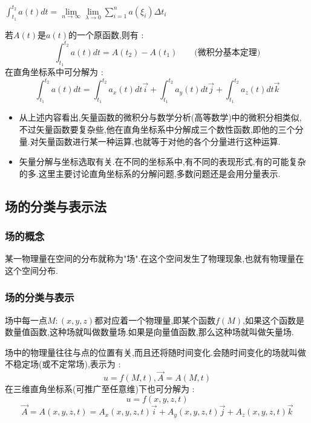\documentclass[UTF8,12pt]{ctexbook}
\newcommand{\limNormal}[1]{\lim\limits_{#1}}
\newcommand{\upDownSum}[2]{\sum\limits_{#2}^{#1}}
\newcommand{\defFunction}[1]{f(#1)}
\newcommand{\definiteIntegral}[2]{\int^{#1}_{#2}}
\newcommand{\spaceline}{\\\indent}
\begin{document}
{{{{{      $\definiteIntegral{t_2}{t_1}a(t)dt = \limNormal{n \to \infty}\limNormal{\lambda \to 0}\upDownSum{n}{i = 1}a(\xi_i)\Delta t_i$

      若$A(t)$是$a(t)$的一个原函数,则有 :
      $$
        \definiteIntegral{t_2}{t_1}a(t)dt = A(t_2) - A(t_1)\qquad \mbox{(微积分基本定理)}
      $$
      在直角坐标系中可分解为 :
      $$
        \definiteIntegral{t_2}{t_1}a(t)dt = \definiteIntegral{t_2}{t_1}a_x(t)dt\vec{i} + \definiteIntegral{t_2}{t_1}a_y(t)dt\vec{j} + \definiteIntegral{t_2}{t_1}a_z(t)dt\vec{k}
      $$
    }%

    \begin{itemize}
      \item 从上述内容看出,矢量函数的微积分与数学分析(高等数学)中的微积分相类似,不过矢量函数要复杂些,他在直角坐标系中分解成三个数性函数,即他的三个分量.对矢量函数进行某一种运算,也就等于对他的各个分量进行这种运算.
      \item 矢量分解与坐标选取有关.在不同的坐标系中,有不同的表现形式,有的可能复杂的多.这里主要讨论直角坐标系的分解问题,多数问题还是会用分量表示.
    \end{itemize}

  }%

  \subsection{场的分类与表示法}{

    \subsubsection{场的概念}{
      某一物理量在空间的分布就称为"场".在这个空间发生了物理现象,也就有物理量在这个空间分布.
    }%

    \subsubsection{场的分类与表示}{
      场中每一点$M:(x,y,z)$都对应着一个物理量,即某个函数$\defFunction{M}$,如果这个函数是数量值函数,这种场就叫做数量场.如果是向量值函数,那么这种场就叫做矢量场.

      场中的物理量往往与点的位置有关,而且还将随时间变化.会随时间变化的场就叫做不稳定场(或不定常场),表示为 :
      $$
        u= \defFunction{M,t},\vec{A} = A(M,t)
      $$
      在三维直角坐标系(可推广至任意维)下也可分解为 :
      $$
        u = \defFunction{x,y,z,t}
      $$
      $$
        \vec{A} = A(x,y,z,t) = A_x(x,y,z,t)\vec{i} + A_y(x,y,z,t)\vec{j} + A_z(x,y,z,t)\vec{k}
      $$\spaceline

}}}}}
\end{document}
